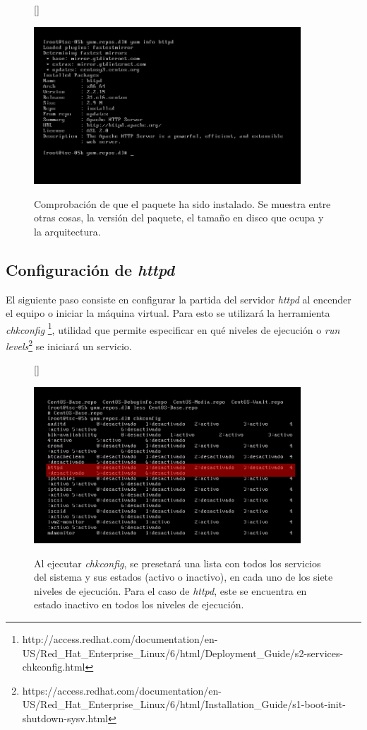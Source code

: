 \documentclass[11pt]{article}
\begin{document}
\begin{figure}[ht]
[\FBwidth]
{\caption{Comprobación de que el paquete ha sido instalado. Se muestra entre otras cosas, la versión del paquete, el tamaño en disco que ocupa y la arquitectura.}\label{fig:httpdInfo}}
{\includegraphics[width=10cm]{screenshots/httpd-install/yum-info-httpd.png}}
\end{figure}

\subsection{Configuración de \textit{httpd}}
El siguiente paso consiste en configurar la partida del servidor \textit{httpd} al encender el equipo o iniciar la máquina virtual. Para esto se utilizará la herramienta \textit{chkconfig} \footnote{http://access.redhat.com/documentation/en-US/Red\_Hat\_Enterprise\_Linux/6/html/Deployment\_Guide/s2-services-chkconfig.html}, utilidad que permite especificar en qué niveles de ejecución o \textit{run levels}\footnote{https://access.redhat.com/documentation/en-US/Red\_Hat\_Enterprise\_Linux/6/html/Installation\_Guide/s1-boot-init-shutdown-sysv.html} se iniciará un servicio. 

\begin{figure}[ht]
[\FBwidth]
{\caption{Al ejecutar \textit{chkconfig}, se presetará una lista con todos los servicios del sistema y sus estados (activo o inactivo), en cada uno de los siete niveles de ejecución. Para el caso de \textit{httpd}, este se encuentra en estado inactivo en todos los niveles de ejecución.}\label{fig:httpdOff}}
{\includegraphics[width=10cm]{screenshots/httpd-run/chkconfig-httpd-off.png}}
\end{figure}
\end{document}
